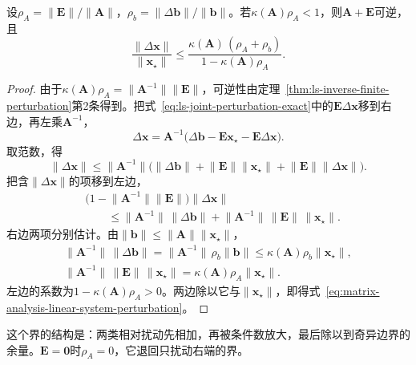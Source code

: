 \begin{theorem}[矩阵与右端同时扰动时的解误差]
\label{thm:ls-linear-system-perturbation}
设$\rho_A=\lVert\bm E\rVert/\lVert\bm A\rVert$，$\rho_b=\lVert\Delta\bm b\rVert/\lVert\bm b\rVert$。若$\kappa(\bm A)\rho_A<1$，则$\bm A+\bm E$可逆，且
\begin{equation}
 \frac{\lVert\Delta\bm x\rVert}{\lVert\bm x_\star\rVert}
 \leq\frac{\kappa(\bm A)\,(\rho_A+\rho_b)}{1-\kappa(\bm A)\rho_A}.
 \label{eq:matrix-analysis-linear-system-perturbation}
\end{equation}
\end{theorem}
\begin{proof}
由于$\kappa(\bm A)\rho_A=\lVert\bm A^{-1}\rVert\lVert\bm E\rVert$，可逆性由定理~\ref{thm:ls-inverse-finite-perturbation}第2条得到。把式~\eqref{eq:ls-joint-perturbation-exact}中的$\bm E\Delta\bm x$移到右边，再左乘$\bm A^{-1}$，
\[
 \Delta\bm x=\bm A^{-1}\bigl(\Delta\bm b-\bm E\bm x_\star-\bm E\Delta\bm x\bigr).
\]
取范数，得
\[
 \lVert\Delta\bm x\rVert\leq\lVert\bm A^{-1}\rVert\bigl(\lVert\Delta\bm b\rVert+\lVert\bm E\rVert\lVert\bm x_\star\rVert+\lVert\bm E\rVert\lVert\Delta\bm x\rVert\bigr).
\]
把含$\lVert\Delta\bm x\rVert$的项移到左边，
\[
 \begin{aligned}
 &\bigl(1-\lVert\bm A^{-1}\rVert\lVert\bm E\rVert\bigr)\lVert\Delta\bm x\rVert\\
 &\qquad\leq\lVert\bm A^{-1}\rVert\,\lVert\Delta\bm b\rVert+\lVert\bm A^{-1}\rVert\,\lVert\bm E\rVert\,\lVert\bm x_\star\rVert .
 \end{aligned}
\]
右边两项分别估计。由$\lVert\bm b\rVert\leq\lVert\bm A\rVert\lVert\bm x_\star\rVert$，
\[
 \begin{gathered}
 \lVert\bm A^{-1}\rVert\,\lVert\Delta\bm b\rVert=\lVert\bm A^{-1}\rVert\,\rho_b\lVert\bm b\rVert\leq\kappa(\bm A)\rho_b\lVert\bm x_\star\rVert,\\
 \lVert\bm A^{-1}\rVert\,\lVert\bm E\rVert\,\lVert\bm x_\star\rVert=\kappa(\bm A)\rho_A\lVert\bm x_\star\rVert .
 \end{gathered}
\]
左边的系数为$1-\kappa(\bm A)\rho_A>0$。两边除以它与$\lVert\bm x_\star\rVert$，即得式~\eqref{eq:matrix-analysis-linear-system-perturbation}。
\end{proof}

这个界的结构是：两类相对扰动先相加，再被条件数放大，最后除以到奇异边界的余量。$\bm E=\bm0$时$\rho_A=0$，它退回只扰动右端的界。

